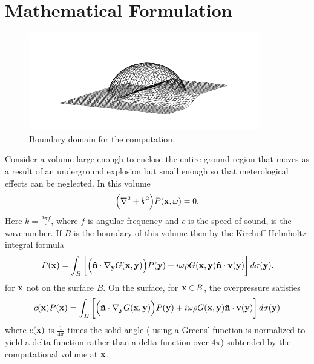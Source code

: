 
\section{Mathematical Formulation}\label{sec:math_formulation}

\begin{figure}[h]
  \centering
  \includegraphics[height=120pt,trim=10 10 10 40,clip]{figures/surface.pdf}
  \caption{Boundary domain for the computation.}
  \label{fig:boundary_domain}
\end{figure}

Consider a volume large enough to enclose the entire ground region that moves as a result of an underground explosion but small enough so that meterological effects can be neglected. In this volume
\[
\Big(\nabla^2+k^2\Big)P({\bf x},\omega)=0.
\]
Here $k=\frac{2\pi f}{c}$, where $f$ is angular frequency and $c$ is the speed of sound, is the wavenumber. If $B$ is the boundary of this volume then by the Kirchoff-Helmholtz integral formula \cite{morse1968theoretical}
\begin{equation}\label{eq:kirk_helm}
P({\bf x})
=
\int_{B} \bigg[
\Big({\bf \hat n}\cdot\nabla_{\bf y} G({\bf x},{\bf y})\Big)P({\bf y})
+
i\omega\rho G({\bf x},{\bf y}){\bf \hat n}\cdot{\bf v}({\bf y})
\bigg]\, d\sigma({\bf y}).
\end{equation}
for ${\bf x}$ not on the surface $B$. On the surface, for ${\bf x}\in B$, the overpressure satisfies 
\begin{equation}\label{eq:kirk_helm_P_on_surface}
c({\bf x})P({\bf x})
=
\int_{B} \bigg[
\Big({\bf \hat n}\cdot\nabla_{\bf y} G({\bf x},{\bf y})\Big)P({\bf y})
+
i\omega\rho G({\bf x},{\bf y}){\bf \hat n}\cdot{\bf v}({\bf y})
\bigg]\, d\sigma({\bf y})
\end{equation}
where $c({\bf x})$ is $\frac{1}{4\pi}$ times the solid angle ({\color{red} using a Greens' function is normalized to yield a delta function rather than a delta function over $4\pi$}) subtended by the computational volume at ${\bf x}$. 

